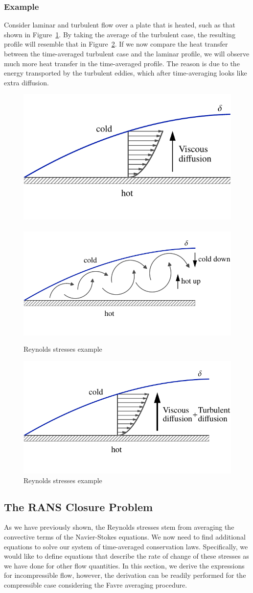 \subsubsection{Example}
Consider laminar and turbulent flow over a plate that is heated, such as that shown in Figure~\ref{fig:heated_plate_flow}. By taking the average of the turbulent case, the resulting profile will resemble that in Figure~\ref{fig:heated_plate_flow_2}. If we now compare the heat transfer between the time-averaged turbulent case and the laminar profile, we will observe much more heat transfer in the time-averaged profile. The reason is due to the energy transported by the turbulent eddies, which after time-averaging looks like extra diffusion. 
\begin{figure}[htbp]
	\centering
	\includegraphics[height=0.25\linewidth]{Pictures/heated_plate_flow_0}~
	\includegraphics[height=0.25\linewidth]{Pictures/heated_plate_flow_2}
	\caption{Reynolds stresses example}
	\label{fig:heated_plate_flow}
\end{figure}

\begin{figure}[htbp]
	\centering
	\includegraphics[height=0.25\linewidth]{Pictures/heated_plate_flow_1}
	\caption{Reynolds stresses example}
	\label{fig:heated_plate_flow_2}
\end{figure}

\subsection{The RANS Closure Problem}
As we have previously shown, the Reynolds stresses stem from averaging the convective terms of the Navier-Stokes equations. We now need to find additional equations to solve our system of time-averaged conservation laws. Specifically, we would like to define equations that describe the rate of change of these stresses as we have done for other flow quantities. In this section, we derive the expressions for incompressible flow, however, the derivation can be readily performed for the compressible case considering the Favre averaging procedure. 

